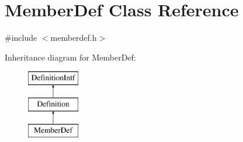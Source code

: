 \hypertarget{class_member_def}{}\section{Member\+Def Class Reference}
\label{class_member_def}


{\ttfamily \#include $<$memberdef.\+h$>$}

Inheritance diagram for Member\+Def\+:\begin{figure}[H]
\begin{center}
\leavevmode
\includegraphics[height=3.000000cm]{class_member_def}
\end{center}
\end{figure}
